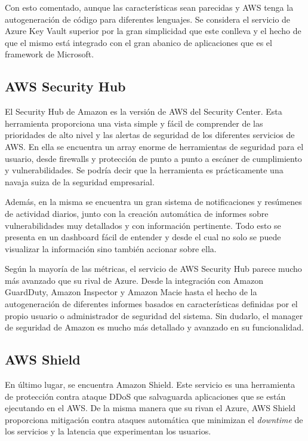 \documentclass[english,runningheads,a4paper]{llncs}[2018/03/10]
\begin{document}
Con esto comentado, aunque las características sean parecidas y AWS tenga la
autogeneración de código para diferentes lenguajes. Se considera el servicio de
Azure Key Vault superior por la gran simplicidad que este conlleva y el hecho de
que el mismo está integrado con el gran abanico de aplicaciones que es el
framework de Microsoft.

\subsection*{AWS Security Hub}
El Security Hub de Amazon es la versión de AWS del Security Center. Esta
herramienta proporciona una vista simple y fácil de comprender de las
prioridades de alto nivel y las alertas de seguridad de los diferentes servicios
de AWS. En ella se encuentra un array enorme de herramientas de seguridad para
el usuario, desde firewalls y protección de punto a punto a escáner de
cumplimiento y vulnerabilidades. Se podría decir que la herramienta es
prácticamente una navaja suiza de la seguridad empresarial.

Además, en la misma se encuentra un gran sistema de notificaciones y resúmenes
de actividad diarios, junto con la creación automática de informes sobre
vulnerabilidades muy detallados y con información pertinente. Todo esto se
presenta en un dashboard fácil de entender y desde el cual no solo se puede
visualizar la información sino también accionar sobre ella. 

Según la mayoría de las métricas, el servicio de AWS Security Hub parece mucho
más avanzado que su rival de Azure. Desde la integración con Amazon GuardDuty,
Amazon Inspector y Amazon Macie hasta el hecho de la autogeneración de
diferentes informes basados en características definidas por el propio usuario o
administrador de seguridad del sistema. Sin dudarlo, el manager de seguridad de
Amazon es mucho más detallado y avanzado en su funcionalidad.

\subsection*{AWS Shield}
En último lugar, se encuentra Amazon Shield. Este servicio es una herramienta de
protección contra ataque DDoS que salvaguarda aplicaciones que se están
ejecutando en el AWS. De la misma manera que su rivan el Azure, AWS Shield
proporciona mitigación contra ataques automática que minimizan el
\textit{downtime} de los servicios y la latencia que experimentan los usuarios. 
\end{document}

